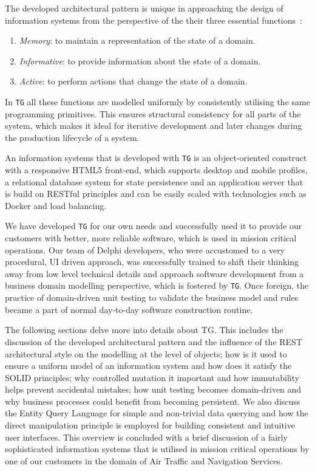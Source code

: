 \documentclass[a4paper,10pt,oneside,openright,final]{memoir} %
\begin{document}
	The developed architectural pattern is unique in approaching the design of information systems from the perspective of the their three essential functions~\cite{oli2007}:
	\begin{enumerate}
    	\item \emph{Memory}: to maintain a representation of the state of a domain.
    	\item \emph{Informative}: to provide information about the state of a domain.
    	\item \emph{Active}: to perform actions that change the state of a domain. 
	\end{enumerate}  	
	In \texttt{TG} all these functions are modelled uniformly by consistently utilising the same programming primitives.
	This ensures structural consistency for all parts of the system, which makes it ideal for iterative development and later changes during the production lifecycle of a system.
		
	An information systems that is developed with \texttt{TG} is an object-oriented construct with a responsive HTML5 front-end, which supports desktop and mobile profiles, a relational database system for state persistence and an application server that is build on RESTful principles and can be easily scaled with technologies such as Docker and load balancing.
	
	We have developed \texttt{TG} for our own needs and successfully used it to provide our customers with better, more reliable software, which is used in mission critical operations.
	Our team of Delphi developers, who were accustomed to a very procedural, UI driven approach, was successfully trained to shift their thinking away from low level technical details and approach software development from a business domain modelling perspective, which is fostered by \texttt{TG}.
	Once foreign, the practice of domain-driven unit testing to validate the business model and rules became a part of normal day-to-day software construction routine.
	
	
	The following sections delve more into details about TG.
	This includes the discussion of the developed architectural pattern and the influence of the REST architectural style on the modelling at the level of objects; how is it used to ensure a uniform model of an information system and how does it satisfy the SOLID principles; why controlled mutation it important and how immutability helps prevent accidental mistakes; how unit testing becomes domain-driven and why business processes could benefit from becoming persistent.
	We also discuss the Entity Query Language for simple and non-trivial data querying and how the direct manipulation principle is employed for building consistent and intuitive user interfaces.
	This overview is concluded with a brief discussion of a fairly sophisticated information systems that is utilised in mission critical operations by one of our customers in the domain of Air Traffic and Navigation Services.
\end{document}
